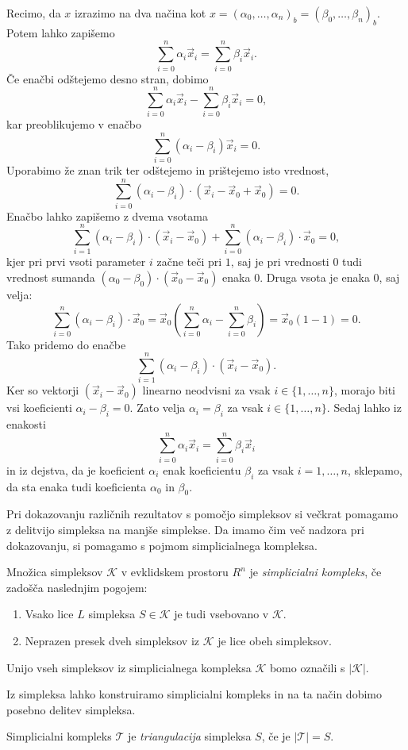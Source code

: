 \documentclass[mat1]{fmfdelo}
\newcommand{\0}{\underline{0}}
\newcommand{\pK}{\mathcal K}
\newcommand{\pT}{\mathcal T}
\begin{document}
\begin{dokaz}
Recimo, da $x$ izrazimo na dva načina kot $x = \left (\alpha_0, \dots, \alpha_n \right )_b = \left (\beta_0, \dots, \beta_n \right )_b$. Potem lahko zapišemo 
$$\sum_{i=0}^n \alpha_i \vec{x}_i = \sum_{i=0}^n \beta_i \vec{x}_i.$$
Če enačbi odštejemo desno stran, dobimo 
$$\sum_{i=0}^n \alpha_i \vec{x}_i - \sum_{i=0}^n \beta_i \vec{x}_i = 0,$$
kar preoblikujemo v enačbo
$$\sum_{i=0}^n (\alpha_i - \beta_i) \vec{x}_i  = 0.$$
Uporabimo že znan trik ter odštejemo in prištejemo isto vrednost,
$$\sum_{i=0}^n (\alpha_i  - \beta_i) \cdot (\vec{x}_i - \vec{x}_0 + \vec{x}_0) = 0.$$
Enačbo lahko zapišemo z dvema vsotama
$$\sum_{i=1}^n (\alpha_i  - \beta_i) \cdot (\vec{x}_i -\vec{x}_0) + \sum_{i=0}^n (\alpha_i  - \beta_i) \cdot \vec{x}_0= 0,$$
kjer pri prvi vsoti parameter $i$ začne teči pri $1$, saj je pri vrednosti $0$ tudi vrednost sumanda  $(\alpha_0 - \beta_0) \cdot (\vec{x}_0 -\vec{x}_0)$ enaka $0$. Druga vsota je enaka $0$, saj velja:
$$\sum_{i=0}^n (\alpha_i  - \beta_i) \cdot \vec{x}_0= \vec{x}_0 \left (\sum_{i=0}^n \alpha_i  - \sum_{i=0}^n \beta_i \right) = \vec{x}_0 (1 - 1)= 0.$$
Tako pridemo do enačbe 
$$\sum_{i=1}^n (\alpha_i  - \beta_i) \cdot (\vec{x}_i - \vec{x}_0).$$
Ker so vektorji $(\vec{x}_i - \vec{x}_0)$ linearno neodvisni za vsak $i \in \{ 1, \dots, n \}$, morajo biti vsi koeficienti $\alpha_i  - \beta_i = 0$. Zato velja $\alpha_i  = \beta_i$ za vsak $i \in \{ 1, \dots, n \}$. Sedaj lahko iz enakosti
$$\sum_{i=0}^n \alpha_i \vec{x}_i = \sum_{i=0}^n \beta_i \vec{x}_i$$
in iz dejstva, da je koeficient $\alpha_i$ enak koeficientu $\beta_i$ za vsak $i = 1, \dots, n$, sklepamo, da sta enaka tudi koeficienta $\alpha_0$ in $\beta_0$.
\end{dokaz}

Pri dokazovanju različnih rezultatov s pomočjo simpleksov si večkrat pomagamo z delitvijo simpleksa na manjše simplekse. Da imamo čim več nadzora pri dokazovanju, si pomagamo s pojmom simplicialnega kompleksa.
\begin{definicija}
Množica simpleksov $\pK$ v evklidskem prostoru $R^n$ je \emph{simplicialni kompleks}, če zadošča naslednjim pogojem:
\begin{enumerate}
\item Vsako lice $L$ simpleksa $S \in \pK$ je tudi vsebovano v $\pK$.
\item Neprazen presek dveh simpleksov iz $\pK$ je lice obeh simpleksov.
\end{enumerate}
Unijo vseh simpleksov iz simplicialnega kompleksa $\pK$ bomo označili s $| \pK |$.
\end{definicija}
Iz simpleksa lahko konstruiramo simplicialni kompleks in na ta način dobimo posebno delitev simpleksa.
\begin{definicija}
Simplicialni kompleks $\pT$ je \emph{triangulacija} simpleksa $S$, če je $|\pT| = S$.
\end{definicija}
\end{document}

